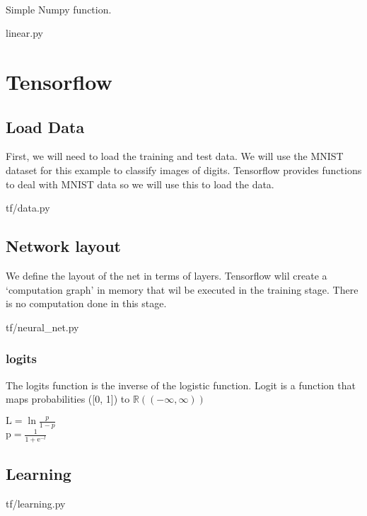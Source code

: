 \documentclass[11pt,a4paper]{article}
\begin{document}
\par
\\[11pt]
Simple Numpy function.


{linear.py}

\newpage
\section{Tensorflow}

\subsection{Load Data}

First, we will need to load the training and test data.
We will use the MNIST dataset for this example to classify images of digits.
Tensorflow provides functions to deal with MNIST data so we will use this to
load the data.


{tf/data.py}

\newpage
\subsection{Network layout}

We define the layout of the net in terms of layers.
Tensorflow wlil create a `computation graph' in memory that wil be executed
in the training stage. There is no computation done in this stage.


{tf/neural_net.py}

\subsubsection{logits}
The logits function is the inverse of the logistic function.
Logit is a function that maps probabilities ([0, 1]) to $\mathbb{R} ((-\infty, \infty))$

$\mathrm{L} = \ln{\frac{p}{1 - p}}$\\
$\mathrm{p} = \frac{1}{1 + \mathrm{e}^{-l}}$


\newpage
\subsection{Learning}

{tf/learning.py}
\end{document}

